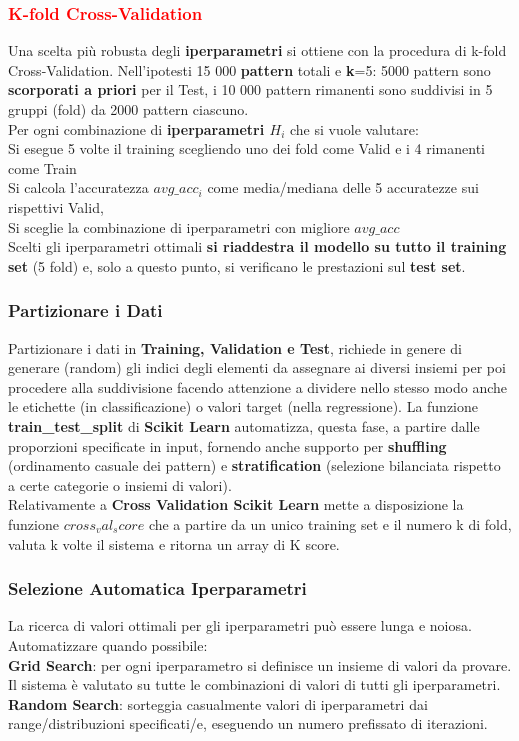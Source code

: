 \documentclass{article}
\begin{document}
\subsubsection{\textcolor{red} {K-fold Cross-Validation}}
Una scelta più robusta degli \textbf{iperparametri} si ottiene con la procedura di k-fold Cross-Validation. Nell'ipotesti 15 000 \textbf{pattern} totali e \textbf{k}=5: 5000 pattern sono \textbf{scorporati a priori} per il Test, i 10 000 pattern rimanenti sono suddivisi in 5 gruppi (fold) da 2000 pattern ciascuno. \\
Per ogni combinazione di \textbf{iperparametri $H_i$} che si vuole valutare:\\
Si esegue 5 volte il training scegliendo uno dei fold come Valid e i 4 rimanenti come Train\\
Si calcola l'accuratezza \textbf{$avg\_acc_i$} come media/mediana delle 5 accuratezze sui rispettivi Valid,\\
Si sceglie la combinazione di iperparametri con migliore \textbf{$avg\_acc$}\\
Scelti gli iperparametri ottimali \textbf{si riaddestra il modello su tutto il training set} (5 fold) e, solo a questo punto, si verificano le prestazioni sul \textbf{test set}.
\subsubsection{Partizionare i Dati}
Partizionare i dati in \textbf{Training, Validation e Test}, richiede in genere di generare (random) gli indici degli elementi da assegnare ai diversi insiemi per poi procedere alla suddivisione facendo attenzione a dividere nello stesso modo anche le etichette (in classificazione) o valori target (nella regressione). La funzione \textbf{train\_test\_split} di \textbf{Scikit Learn} automatizza, questa fase, a partire dalle proporzioni specificate in input, fornendo anche supporto per \textbf{shuffling} (ordinamento casuale dei pattern) e \textbf{stratification} (selezione bilanciata rispetto a certe categorie o insiemi di valori).\\
Relativamente a \textbf{Cross Validation Scikit Learn} mette a disposizione la funzione \textbf{$cross_val_score$} che a partire da un unico training set e il numero k di fold, valuta k volte il sistema e ritorna un array di K score.
\subsubsection{Selezione Automatica Iperparametri}
La ricerca di valori ottimali per gli iperparametri può essere lunga e noiosa. Automatizzare quando possibile:\\
\textbf{Grid Search}: per ogni iperparametro si definisce un insieme di valori da provare. Il sistema è valutato su tutte le combinazioni di valori di tutti gli iperparametri. \\
\textbf{Random Search}: sorteggia casualmente valori di iperparametri dai range/distribuzioni specificati/e, eseguendo un numero prefissato di iterazioni.
\end{document}
